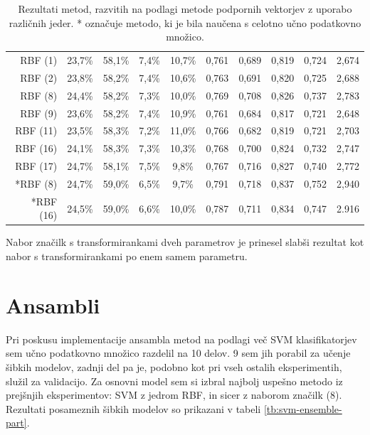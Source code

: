 \documentclass[11pt,a4paper,openany]{book}
\begin{document}
\begin{table}[h!]
\begin{tabular}{r|cccc|cccc|c}
		RBF (1) & 23,7\% & 58,1\% & 7,4\% & 10,7\% &
		0,761 & 0,689 & 0,819 & 0,724 &
		2,674 \\								
		RBF (2) & 23,8\% & 58,2\% & 7,4\% & 10,6\% &
		0,763 & 0,691 & 0,820 & 0,725 &
		2,688 \\
		RBF (8) & 24,4\% & 58,2\% & 7,3\% & 10,0\% &
		0,769 & 0,708 & 0,826 & 0,737 &
		2,783 \\			
		RBF (9) & 23,6\% & 58,2\% & 7,4\% & 10,9\% &
		0,761 & 0,684 & 0,817 & 0,721 &
		2,648 \\
		RBF (11) & 23,5\% & 58,3\% & 7,2\% & 11,0\% &
		0,766 & 0,682 & 0,819 & 0,721 &
		2,703 \\
		RBF (16) & 24,1\% & 58,3\% & 7,3\% & 10,3\% &
		0,768 & 0,700 & 0,824 & 0,732 &
		2,747 \\
		RBF (17) & 24,7\% & 58,1\% & 7,5\% & 9,8\% &
		0,767 & 0,716 & 0,827 & 0,740 &
		2,772 \\
		
		\hline
		*RBF (8) & 24,7\% & 59,0\% & 6,5\% & 9,7\% &
		0,791 & 0,718 & 0,837 & 0,752 &
		2,940 \\
		*RBF (16) & 24,5\% & 59,0\% & 6,6\% & 10,0\% &
		0,787 & 0,711 & 0,834 & 0,747 &
		2.916 \\
		
		
	\end{tabular}
	\caption{Rezultati metod, razvitih na podlagi metode podpornih vektorjev z uporabo različnih jeder. * označuje metodo, ki je bila naučena s celotno učno podatkovno množico.}
	\label{tb:svm_kernel}
\end{table}

Nabor značilk s transformirankami dveh parametrov je prinesel slabši rezultat kot nabor s transformirankami po enem samem parametru.

\section{Ansambli}

Pri poskusu implementacije ansambla metod na podlagi več SVM klasifikatorjev sem učno podatkovno množico razdelil na 10 delov. 9 sem jih porabil za učenje šibkih modelov, zadnji del pa je, podobno kot pri vseh ostalih eksperimentih, služil za validacijo. Za osnovni model sem si izbral najbolj uspešno metodo iz prejšnjih eksperimentov: SVM z jedrom RBF, in sicer z naborom značilk (8). Rezultati posameznih šibkih modelov so prikazani v tabeli \ref{tb:svm-ensemble-part}.
\end{document}
